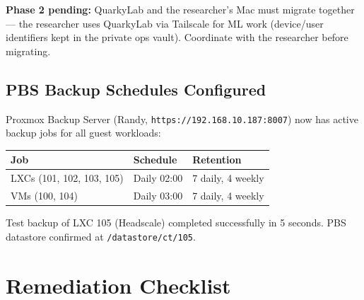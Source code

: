 \documentclass[11pt,a4paper]{article}
\begin{document}
\textbf{Phase 2 pending:} QuarkyLab and the researcher's Mac must migrate together — the
researcher uses QuarkyLab via Tailscale for ML work (device/user identifiers kept in the
private ops vault). Coordinate with the researcher before migrating.

\subsection{PBS Backup Schedules Configured}

Proxmox Backup Server (Randy, \texttt{https://192.168.10.187:8007}) now has active backup
jobs for all guest workloads:

\begin{center}
\begin{tabular}{lll}
\toprule
\textbf{Job} & \textbf{Schedule} & \textbf{Retention} \\
\midrule
LXCs (101, 102, 103, 105) & Daily 02:00 & 7 daily, 4 weekly \\
VMs (100, 104) & Daily 03:00 & 7 daily, 4 weekly \\
\bottomrule
\end{tabular}
\end{center}

Test backup of LXC 105 (Headscale) completed successfully in 5 seconds. PBS datastore
confirmed at \texttt{/datastore/ct/105}.

\section{Remediation Checklist}
\end{document}
